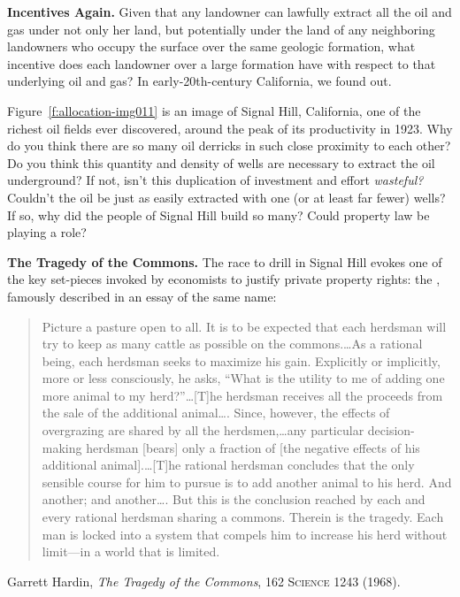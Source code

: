 \item \textbf{Incentives Again.} Given that any landowner can lawfully extract
all the oil and gas under not only her land, but potentially under the land of
any neighboring landowners who occupy the surface over the same geologic
formation, what incentive does each landowner over a large formation have with
respect to that underlying oil and gas? In early-20th-century California, we
found out.


Figure~\ref{f:allocation-img011} is an image of Signal Hill, California, one of
the richest oil fields ever
discovered, around the peak of its productivity in 1923. Why do you think there
are so many oil derricks in such close proximity to each other? Do you think
this quantity and density of wells are necessary to extract the oil underground?
If not, isn't this duplication of investment and effort \textit{wasteful?}
Couldn't the oil be just as easily extracted with one (or at least far fewer)
wells? If so, why did the people of Signal Hill build so many? Could property
law be playing a role?


\item \textbf{The Tragedy of the Commons.} The race to drill in Signal Hill
evokes one of the key set-pieces invoked by economists to justify private
property rights: the , famously described in an
essay of the same name:
\begin{quote}
Picture a pasture open to all. It is to be expected that each herdsman will
try to keep as many cattle as possible on the commons.\ldots As a rational
being, each herdsman seeks to maximize his gain. Explicitly or implicitly, more
or less consciously, he asks, ``What is the utility to me of adding one more
animal to my herd?''\ldots [T]he herdsman receives all the proceeds from the
sale of the additional animal\ldots . Since, however, the effects of overgrazing
are shared by all the herdsmen,\ldots any particular decision-making herdsman
[bears] only a fraction of [the negative effects of his additional
animal].\ldots [T]he rational herdsman concludes that the only sensible course
for him to pursue is to add another animal to his herd. And another; and
another\ldots. But this is the conclusion reached by each and every rational
herdsman sharing a commons. Therein is the tragedy. Each man is locked into a
system that compels him to increase his herd without limit---in a world that is
limited.
\end{quote}
Garrett Hardin, \textit{The Tragedy of the Commons}, 162 \textsc{Science} 1243
(1968). 

